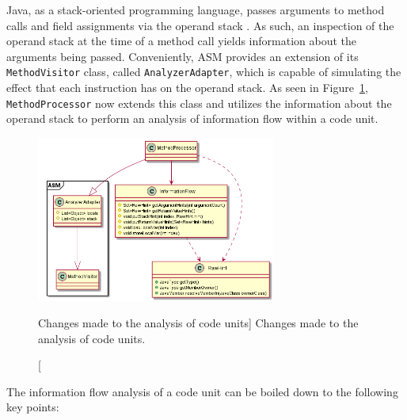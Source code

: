 Java, as a stack-oriented programming language, passes arguments to method calls and field assignments via the operand stack \cite{hutchison_information_2005}. As such, an inspection of the operand stack at the time of a method call yields information about the arguments being passed.
Conveniently, ASM provides an extension of its \texttt{MethodVisitor} class, called \texttt{AnalyzerAdapter}, which is capable of simulating the effect that each instruction has on the operand stack. As seen in Figure~\ref{fig:method_processor_2}, \texttt{MethodProcessor} now extends this class and utilizes the information about the operand stack to perform an analysis of information flow within a code unit.

\begin{figure}
    \centering
    \includegraphics[width=0.7\textwidth]{figure/extension/MethodProcessor2.png}
    \caption
        [Changes made to the analysis of code units]
        {Changes made to the analysis of code units.}
    \label{fig:method_processor_2}
\end{figure}

The information flow analysis of a code unit can be boiled down to the following key points:

